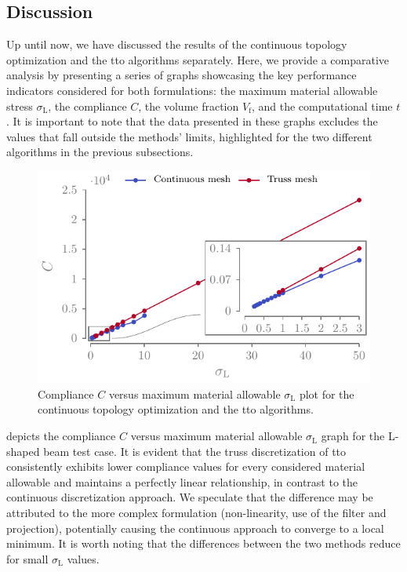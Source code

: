 \subsection{Discussion}
Up until now, we have discussed the results of the continuous topology optimization and the \gls{tto} algorithms separately. Here, we provide a comparative analysis by presenting a series of graphs showcasing the key performance indicators considered for both formulations: the maximum material allowable stress $\sigma_\text{L}$, the compliance $C$, the volume fraction $V_\text{f}$, and the computational time $t$. It is important to note that the data presented in these graphs excludes the values that fall outside the methods' limits, highlighted for the two different algorithms in the previous subsections.
\begin{figure}
    \centering
    \includegraphics{figures/03_comparison_TO_TTO/14_stress_comp/stress_comp.pdf}
    \caption{Compliance $C$ versus maximum material allowable $\sigma_\text{L}$ plot for the continuous topology optimization and the \gls{tto} algorithms.}
    \label{fig:03_stress_comp}
\end{figure}

 depicts the compliance $C$ versus maximum material allowable $\sigma_\text{L}$ graph for the L-shaped beam test case. It is evident that the truss discretization of \gls{tto} consistently exhibits lower compliance values for every considered material allowable and maintains a perfectly linear relationship, in contrast to the continuous discretization approach. We speculate that the difference may be attributed to the more complex formulation (non-linearity, use of the filter and projection), potentially causing the continuous approach to converge to a local minimum. It is worth noting that the differences between the two methods reduce for small $\sigma_\text{L}$ values.

